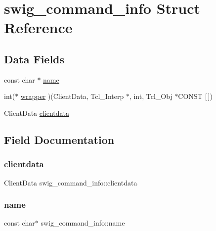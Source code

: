 \hypertarget{structswig__command__info}{}\section{swig\+\_\+command\+\_\+info Struct Reference}
\label{structswig__command__info}
\subsection*{Data Fields}
\begin{DoxyCompactItemize}
\item 
const char $\ast$ \hyperlink{structswig__command__info_a5c3fec9159e5dc6429b27889dd9a903d}{name}
\item 
int($\ast$ \hyperlink{structswig__command__info_acd779e4b3dc31b81f4e40b6f06128bea}{wrapper} )(Client\+Data, Tcl\+\_\+\+Interp $\ast$, int, Tcl\+\_\+\+Obj $\ast$C\+O\+N\+ST \mbox{[}$\,$\mbox{]})
\item 
Client\+Data \hyperlink{structswig__command__info_a7418da5fdc25428d9cebfb6da0c6f6f2}{clientdata}
\end{DoxyCompactItemize}


\subsection{Field Documentation}
\mbox{\label{structswig__command__info_a7418da5fdc25428d9cebfb6da0c6f6f2}} 
\subsubsection{\texorpdfstring{clientdata}{clientdata}}
{\footnotesize\ttfamily Client\+Data swig\+\_\+command\+\_\+info\+::clientdata}

\mbox{\label{structswig__command__info_a5c3fec9159e5dc6429b27889dd9a903d}} 
\subsubsection{\texorpdfstring{name}{name}}
{\footnotesize\ttfamily const char$\ast$ swig\+\_\+command\+\_\+info\+::name}

